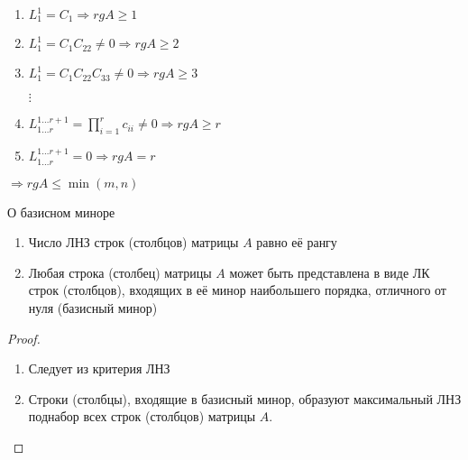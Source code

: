 \begin{enumerate}
    \item $L_1^1=C_1 \Rightarrow rg A \geq 1$
    \item $L_1^1=C_1C_{22}\not=0 \Rightarrow rg A \geq 2$
    \item $L_1^1=C_1C_{22}C_{33}\not=0 \Rightarrow rg A \geq 3$
    
    $\vdots$
    \item $L_{1\ldots r}^{1\ldots r+1} = \prod\limits_{i=1}^r c_{ii}\not=0 \Rightarrow rg A\geq r$
    \item $L_{1\ldots r}^{1\ldots r+1} = 0 \Rightarrow rg A= r$
\end{enumerate}
$\Rightarrow rg A\leq \min(m, n)$

\begin{theorem}
    О базисном миноре

    \begin{enumerate}
        \item Число ЛНЗ строк (столбцов) матрицы $A$ равно её рангу
        \item Любая строка (столбец) матрицы $A$ может быть представлена в виде ЛК строк (столбцов), входящих в её минор наибольшего порядка, отличного от нуля (базисный минор)
    \end{enumerate}
\end{theorem}
\begin{proof}
    \begin{enumerate}
        \item Следует из критерия ЛНЗ
        \item Строки (столбцы), входящие в базисный минор, образуют максимальный ЛНЗ поднабор всех строк (столбцов) матрицы $A$.        
    \end{enumerate}
\end{proof}

